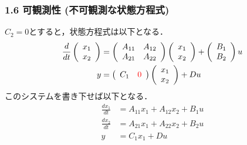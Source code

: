\documentclass[10pt]{beamer}
\begin{document}
\begin{frame}[t]
\frametitle{1.6 可観測性 (不可観測な状態方程式)}
$C_2=0$とすると，状態方程式は以下となる．
\begin{align}
 \frac{d}{dt}
  \left(\begin{array}{c}
         {x}_1 \\
   {x}_2
  \end{array}\right)
  &=
  \left(\begin{array}{cc}
         {A}_{11} & {A}_{12} \\
       {A}_{21} & {A}_{22}
  \end{array}\right)
  \left(\begin{array}{c}
         {x}_1 \\
   {x}_2
  \end{array}\right)
  +
  \left(\begin{array}{c}
         {B}_1 \\
   {B}_2
  \end{array}\right)
  u \\
 y &=
  \left(\begin{array}{cc}
         {C}_1 & \textcolor{red}{0}
  \end{array}\right)
  \left(\begin{array}{c}
         {x}_1 \\
   {x}_2
  \end{array}\right)
  + D u
 
\end{align}
このシステムを書き下せば以下となる．
\begin{align}
 \frac{dx_1}{dt} &= A_{11} x_1 + A_{12} x_2 + B_1 u
 \\
 \frac{dx_2}{dt} &= A_{21} x_1 + A_{22} x_2 + B_2 u
 \\
 y & = C_1 x_1 + Du

\end{align}
\end{frame}
\end{document}
